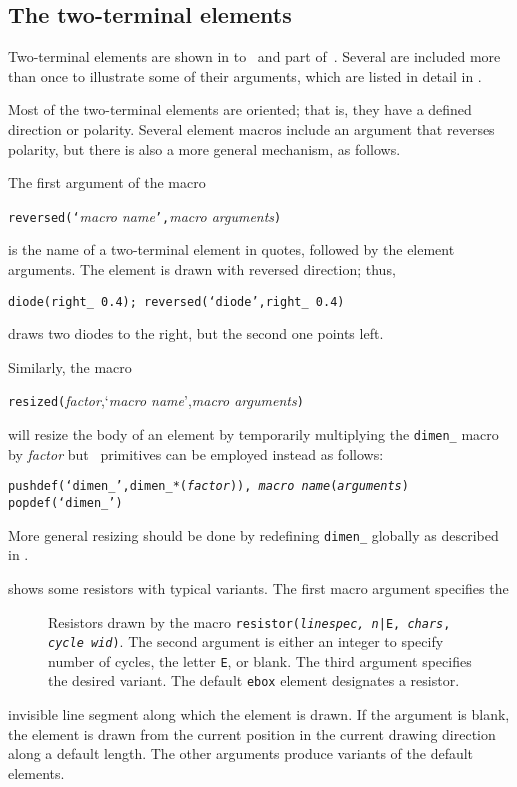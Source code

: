 \subsection{The two-terminal elements\label{Twoterminal:}}
Two-terminal elements are shown in
 to~ and part of~.
Several are included more than once to illustrate
some of their arguments, which are listed in detail in .

Most of the two-terminal elements are oriented; that is, they have
a defined direction or polarity.  Several element macros include an
argument that reverses polarity, but there is also a more general
mechanism, as follows.

The first argument of the macro
\par
{\tt reversed(`}{\sl macro name}{\tt',}{\sl macro arguments}{\tt )}
\par
\noindent
is the name of a two-terminal element in quotes, followed by the
element arguments.  The element is drawn with reversed direction; thus,
\par
{\tt diode(right\_ 0.4); reversed(`diode',right\_ 0.4)}
\par
\noindent
draws two diodes to the right, but the second one points left.

Similarly, the macro
\par
{\tt resized(}{\sl factor},`{\sl macro name}',{\sl macro arguments}{\tt )}
\par
\noindent
will resize the body of an element by temporarily multiplying
the {\tt dimen\_} macro by {\sl factor} but
\Mfour\ primitives can be employed instead as follows:
\par
{\tt pushdef(`dimen\_',dimen\_*({\sl factor})),%
{\sl macro name}({\sl arguments}) popdef(`dimen\_')}
\par
\noindent
More general resizing should be
done by redefining {\tt dimen\_} globally as described in .

\enlargethispage{\baselineskip}
 shows some resistors with typical variants.
The first macro argument specifies the
\begin{figure}[H]
   
   \caption{Resistors drawn by the macro
   {\tt resistor({\sl linespec, n}|E, {\sl chars}, {\sl cycle wid})}.
   The second argument is either an integer to specify number of cycles,
   the letter {\tt E}, or blank. The third argument specifies the desired
   variant.
   The default {\tt ebox} element designates a resistor.}
   \label{Resistors}
   \end{figure}
\noindent%
invisible line segment along which the element is drawn.
If the argument is blank,
the element is drawn from the current position in the current drawing
direction along a default length.
The other arguments produce variants of the default elements.

